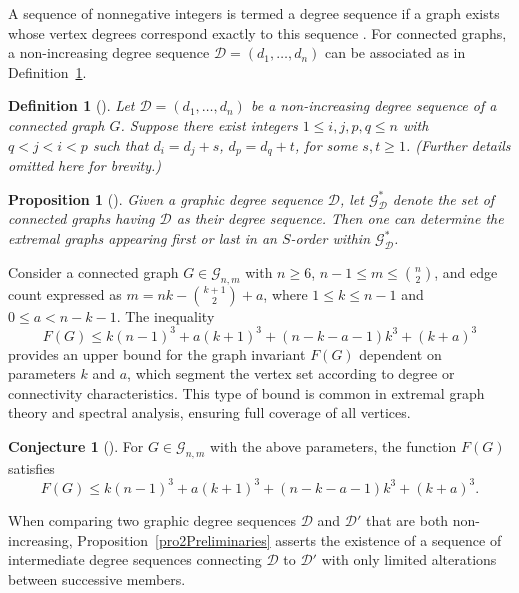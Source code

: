 \documentclass{article}
\newtheorem{proposition}{Proposition}[section]
\newtheorem{definition}{Definition}
\theoremstyle{definition}
\newtheorem{conjecture}{Conjecture}[section]
\begin{document}
A sequence of nonnegative integers is termed a degree sequence if a graph exists whose vertex degrees correspond exactly to this sequence \cite{Schmuck2012WagnerHW}. For connected graphs, a non-increasing degree sequence $\mathscr{D} = (d_1, \ldots, d_n)$ can be associated as in Definition~\ref{defconjn1}.

\begin{definition}[\cite{Zhang2026WangXDH}]\label{defconjn1}
Let $\mathscr{D} = (d_1, \ldots, d_n)$ be a non-increasing degree sequence of a connected graph $G$. Suppose there exist integers $1 \leq i, j, p, q \leq n$ with $q < j < i < p$ such that $d_i = d_j + s$, $d_p = d_q + t$, for some $s, t \geq 1$. (Further details omitted here for brevity.)
\end{definition}

\begin{proposition}[\cite{ShuchaoLSYibing}]\label{pro1Preliminaries}
Given a graphic degree sequence $\mathscr{D}$, let $\mathscr{G}^*_{\mathscr{D}}$ denote the set of connected graphs having $\mathscr{D}$ as their degree sequence. Then one can determine the extremal graphs appearing first or last in an $S$-order within $\mathscr{G}^*_{\mathscr{D}}$.
\end{proposition}

Consider a connected graph $G \in \mathcal{G}_{n,m}$ with $n \geq 6$, $n-1 \leq m \leq \binom{n}{2}$, and edge count expressed as $m = nk - \binom{k+1}{2} + a$, where $1 \leq k \leq n-1$ and $0 \leq a < n-k-1$. The inequality
$$F(G) \leq k (n-1)^3 + a (k+1)^3 + (n-k-a-1) k^3 + (k+a)^3$$
provides an upper bound for the graph invariant $F(G)$ dependent on parameters $k$ and $a$, which segment the vertex set according to degree or connectivity characteristics. This type of bound is common in extremal graph theory and spectral analysis, ensuring full coverage of all vertices.

\begin{conjecture}[\cite{Zhang2026WangXDH}]\label{conjn1}
For $G \in \mathcal{G}_{n,m}$  with the above parameters, the function $F(G)$ satisfies
$$F(G) \leq k (n-1)^3 + a (k+1)^3 + (n-k-a-1) k^3 + (k+a)^3.$$
\end{conjecture}

When comparing two graphic degree sequences $\mathscr{D}$ and $\mathscr{D}'$ that are both non-increasing, Proposition~\ref{pro2Preliminaries} asserts the existence of a sequence of intermediate degree sequences connecting $\mathscr{D}$ to $\mathscr{D}'$ with only limited alterations between successive members.
\end{document}
